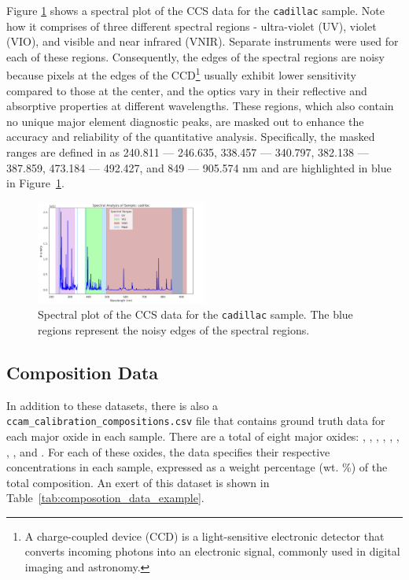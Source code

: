 Figure \ref{fig:masked_regions} shows a spectral plot of the CCS data for the \texttt{cadillac} sample.
Note how it comprises of three different spectral regions - ultra-violet (UV), violet (VIO), and visible and near infrared (VNIR).
Separate instruments were used for each of these regions.
Consequently, the edges of the spectral regions are noisy because pixels at the edges of the CCD\footnote{A charge-coupled device (CCD) is a light-sensitive electronic detector that converts incoming photons into an electronic signal, commonly used in digital imaging and astronomy\cite{radionuclide_imaging}.} usually exhibit lower sensitivity compared to those at the center, and the optics vary in their reflective and absorptive properties at different wavelengths.
These regions, which also contain no unique major element diagnostic peaks, are masked out to enhance the accuracy and reliability of the quantitative analysis\cite{cleggRecalibrationMarsScience2017}.
Specifically, the masked ranges are defined in \citet{cleggRecalibrationMarsScience2017} as 240.811 --- 246.635, 338.457 --- 340.797, 382.138 --- 387.859, 473.184 --- 492.427, and 849 --- 905.574 nm and are highlighted in blue in Figure~\ref{fig:masked_regions}.

\begin{figure}
	\centering
	\includegraphics[width=0.5\textwidth]{images/masked_regions.png}
	\caption{Spectral plot of the CCS data for the \texttt{cadillac} sample. The blue regions represent the noisy edges of the spectral regions.}
	\label{fig:masked_regions}
\end{figure}

\subsection{Composition Data}\label{subsec:composition_data}
In addition to these datasets, there is also a \\ \texttt{ccam\_calibration\_compositions.csv} file that contains ground truth data for each major oxide in each sample.
There are a total of eight major oxides: , , , , , , , , and .
For each of these oxides, the data specifies their respective concentrations in each sample, expressed as a weight percentage (wt. \%) of the total composition.
An exert of this dataset is shown in Table~\ref{tab:composotion_data_example}.

